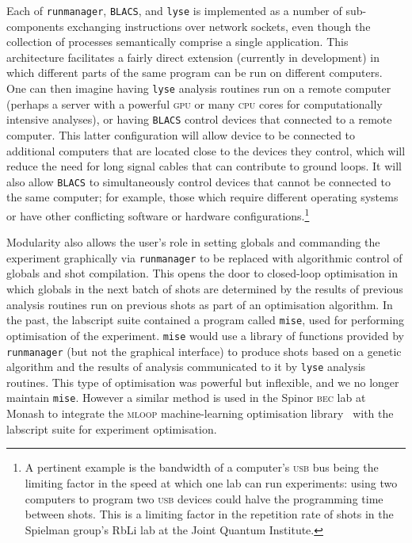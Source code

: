Each of \texttt{runmanager}, \texttt{BLACS}, and \texttt{lyse} is implemented as a number of sub-components exchanging instructions over network sockets, even though the collection of processes semantically comprise a single application. This architecture facilitates a fairly direct extension (currently in development) in which different parts of the same program can be run on different computers. One can then imagine having \texttt{lyse} analysis routines run on a remote computer (perhaps a server with a powerful \textsc{gpu} or many \textsc{cpu} cores for computationally intensive analyses), or having \texttt{BLACS} control devices that connected to a remote computer. This latter configuration will allow device to be connected to additional computers that are located close to the devices they control, which will reduce the need for long signal cables that can contribute to ground loops. It will also allow \texttt{BLACS} to simultaneously control devices that cannot be connected to the same computer; for example, those which require different operating systems or have other conflicting software or hardware configurations.\footnote{A pertinent example is the bandwidth of a computer's \textsc{usb} bus being the limiting factor in the speed at which one lab can run experiments: using two computers to program two \textsc{usb} devices could halve the programming time between shots. This is a limiting factor in the repetition rate of shots in the Spielman group's RbLi lab at the Joint Quantum Institute.}

Modularity also allows the user's role in setting globals and commanding the experiment graphically via \texttt{runmanager} to be replaced with algorithmic control of globals and shot compilation. This opens the door to closed-loop optimisation in which globals in the next batch of shots are determined by the results of previous analysis routines run on previous shots as part of an optimisation algorithm. In the past, the labscript suite contained a program called \texttt{mise}, used for performing optimisation of the experiment. \texttt{mise} would use a library of functions provided by \texttt{runmanager} (but not the graphical interface) to produce shots based on a genetic algorithm and the results of analysis communicated to it by \texttt{lyse} analysis routines. This type of optimisation was powerful but inflexible, and we no longer maintain \texttt{mise}. However a similar method is used in the Spinor \textsc{bec} lab at Monash to integrate the \textsc{mloop} machine-learning optimisation library~\cite{wigley_fast_2016} with the labscript suite for experiment optimisation.

